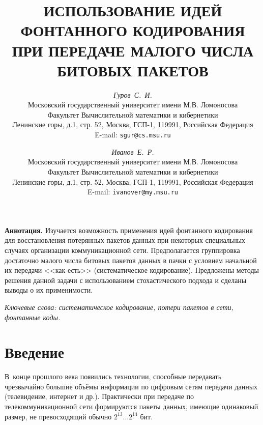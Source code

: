 



\title{ИСПОЛЬЗОВАНИЕ ИДЕЙ ФОНТАННОГО КОДИРОВАНИЯ ПРИ ПЕРЕДАЧЕ МАЛОГО ЧИСЛА БИТОВЫХ ПАКЕТОВ}
\author{\emph{Гуров~С.~И.}\\Московский государственный университет имени М.В. Ломоносова\\
    Факультет Вычислительной математики и кибернетики\\
    Ленинские горы, д.1, стр. 52, Москва, ГСП-1, 119991, Российская Федерация\\
    E-mail: \texttt{sgur@cs.msu.ru}
\and 
\emph{Иванов~Е.~Р.}\\Московский государственный университет имени М.В. Ломоносова\\
    Факультет Вычислительной математики и кибернетики\\
    Ленинские горы, д.1, стр. 52, Москва, ГСП-1, 119991, Российская Федерация\\
    E-mail: \texttt{ivanover@my.msu.ru}}
\date{}

%
\maketitle

\textbf{Аннотация.} 
Изучается возможность применения идей фонтанного кодирования для восстановления потерянных пакетов данных при некоторых специальных случаях организации коммуникационной сети.
Предполагается группировка достаточно малого числа битовых пакетов данных в пачки с условием начальной их передачи
<<как есть>> (систематическое кодирование).
Предложены методы решения данной задачи с использованием стохастического подхода и сделаны выводы о их применимости.

\textit{Ключевые слова: систематическое кодирование, потери пакетов в сети, фонтанные коды.}

\section{Введение}
В~конце прошлого века появились технологии, способные передавать чрезвычайно большие объёмы информации
по цифровым сетям передачи данных (телевидение, интернет и др.).
Практически при передаче по телекоммуникационной сети формируются пакеты данных, имеющие одинаковый размер, не превосходящий обычно 
$2^{13}\ldots2^{14}$ бит.

